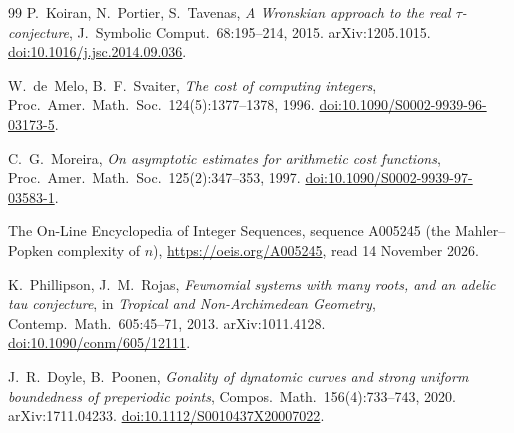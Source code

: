 \documentclass[11pt]{article}
\theoremstyle{definition}
\theoremstyle{remark}
\begin{document}
\begin{thebibliography}{99}
 P.~Koiran, N.~Portier, S.~Tavenas, \emph{A Wronskian approach to the real
$\tau$-conjecture}, J.\ Symbolic Comput.\ 68:195--214, 2015. arXiv:1205.1015.
\href{https://doi.org/10.1016/j.jsc.2014.09.036}{doi:10.1016/j.jsc.2014.09.036}.

 W.~de~Melo, B.~F.~Svaiter, \emph{The cost of computing integers},
Proc.\ Amer.\ Math.\ Soc.\ 124(5):1377--1378, 1996.
\href{https://doi.org/10.1090/S0002-9939-96-03173-5}{doi:10.1090/S0002-9939-96-03173-5}.

 C.~G.~Moreira, \emph{On asymptotic estimates for arithmetic cost functions},
Proc.\ Amer.\ Math.\ Soc.\ 125(2):347--353, 1997.
\href{https://doi.org/10.1090/S0002-9939-97-03583-1}{doi:10.1090/S0002-9939-97-03583-1}.

 The On-Line Encyclopedia of Integer Sequences, sequence A005245 (the
Mahler--Popken complexity of $n$), \url{https://oeis.org/A005245}, read 14 November 2026.

 K.~Phillipson, J.~M.~Rojas, \emph{Fewnomial systems with many roots,
and an adelic tau conjecture}, in \emph{Tropical and Non-Archimedean Geometry}, Contemp.\ Math.\
605:45--71, 2013. arXiv:1011.4128.
\href{https://doi.org/10.1090/conm/605/12111}{doi:10.1090/conm/605/12111}.

 J.~R.~Doyle, B.~Poonen, \emph{Gonality of dynatomic curves and strong
uniform boundedness of preperiodic points}, Compos.\ Math.\ 156(4):733--743, 2020.
arXiv:1711.04233.
\href{https://doi.org/10.1112/S0010437X20007022}{doi:10.1112/S0010437X20007022}.

\end{thebibliography}
\end{document}
